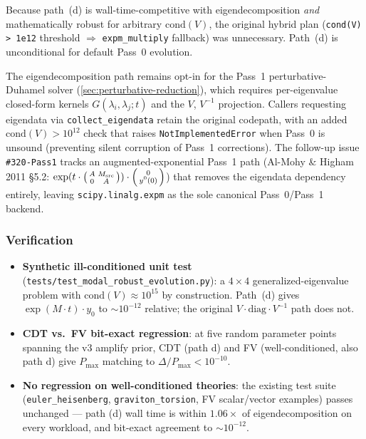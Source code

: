 Because path~(d) is wall-time-competitive with eigendecomposition \emph{and} mathematically robust for arbitrary $\mathrm{cond}(V)$, the original hybrid plan (\texttt{cond(V) > 1e12} threshold $\Rightarrow$ \texttt{expm\_multiply} fallback) was unnecessary. Path~(d) is unconditional for default Pass~0 evolution.

The eigendecomposition path remains opt-in for the Pass~1 perturbative-Duhamel solver (\cref{sec:perturbative-reduction}), which requires per-eigenvalue closed-form kernels $G(\lambda_i, \lambda_j; t)$ and the $V$, $V^{-1}$ projection. Callers requesting eigendata via \texttt{collect\_eigendata} retain the original codepath, with an added $\mathrm{cond}(V) > 10^{12}$ check that raises \texttt{NotImplementedError} when Pass~0 is unsound (preventing silent corruption of Pass~1 corrections). The follow-up issue \texttt{\#320-Pass1} tracks an augmented-exponential Pass~1 path (Al-Mohy \& Higham 2011 \S5.2: $\exp(t \cdot \begin{psmallmatrix} A & M_\text{src} \\ 0 & A \end{psmallmatrix}) \cdot \begin{psmallmatrix} 0 \\ y^0(0) \end{psmallmatrix}$) that removes the eigendata dependency entirely, leaving \texttt{scipy.linalg.expm} as the sole canonical Pass~0/Pass~1 backend.

\subsubsection{Verification}
\label{sec:modal-pade-verification}

\begin{itemize}
  \item \textbf{Synthetic ill-conditioned unit test} (\texttt{tests/test\_modal\_robust\_evolution.py}): a $4\times 4$ generalized-eigenvalue problem with $\mathrm{cond}(V) \approx 10^{15}$ by construction. Path~(d) gives $\exp(M \cdot t) \cdot y_0$ to $\sim 10^{-12}$ relative; the original $V \cdot \mathrm{diag} \cdot V^{-1}$ path does not.
  \item \textbf{CDT vs.\ FV bit-exact regression}: at five random parameter points spanning the v3 amplify prior, CDT (path d) and FV (well-conditioned, also path d) give $P_\text{max}$ matching to $\Delta / P_\text{max} < 10^{-10}$.
  \item \textbf{No regression on well-conditioned theories}: the existing test suite (\texttt{euler\_heisenberg}, \texttt{graviton\_torsion}, FV scalar/vector examples) passes unchanged --- path (d) wall time is within $1.06\times$ of eigendecomposition on every workload, and bit-exact agreement to $\sim 10^{-12}$.
\end{itemize}

